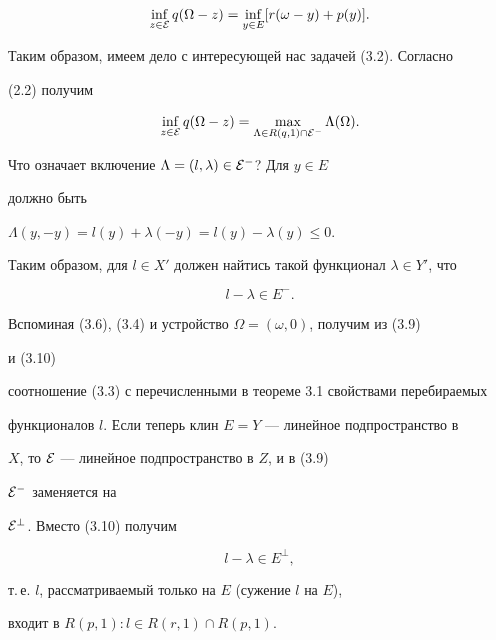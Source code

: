 \begin{pf}
\begin{equation}
\inf_{z\in\cal E}q(\Omega-z)=\inf_{y\in E} 


[r(\omega-y)+p(y)]. 


\end{equation} 


Таким образом, имеем дело с интересующей нас задачей (3.2). Согласно 


(2.2) получим 


\begin{equation} 


\inf_{z\in\cal E}q(\Omega-z)= 


\max_{\Lambda\in R(q,1)\cap\cal E^-}\Lambda(\Omega). 


\end{equation} 


Что означает включение $\Lambda=(l,\lambda)\in\cal E^-$? Для $y\in E$ 


должно быть 


$\Lambda(y,-y)=l(y)+\lambda(-y)=l(y)-\lambda(y)\le0$. 


Таким образом, для $l\in X'$ должен найтись такой функционал $\lambda\in 


Y'$, что 


\begin{equation} 


l-\lambda\in E^-. 


\end{equation} 


Вспоминая (3.6), (3.4) и устройство $\Omega=(\omega,0)$, получим из (3.9) 


и (3.10) 


соотношение (3.3) с перечисленными в теореме 3.1 свойствами перебираемых 


функционалов $l$. Если теперь клин $E=Y$ --- линейное подпространство в 


$X$, то $\cal E$ --- линейное подпространство в $Z$, и в (3.9) 


$\cal E^-$ заменяется на


$\cal E^\bot$. Вместо (3.10) получим 


\begin{equation} 


l-\lambda\in E^\bot, 


\end{equation} 


т.\,е. $l$, рассматриваемый только на $E$ (сужение $l$ на $E$), 


входит в $R(p,1):l\in R(r,1)\cap R(p,1)$. 


\end{pf} 


